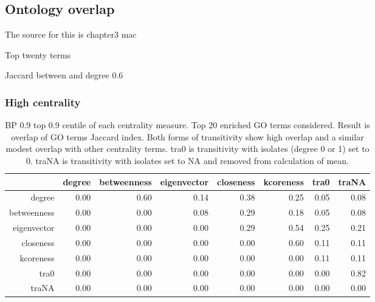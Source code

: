 \clearpage
\subsection{Ontology overlap}

The source for this is chapter3 mac

Top twenty terms

Jaccard between and degree 0.6

\subsubsection{High centrality}

\begin{table}[ht]
\centering
\begin{tabular}{rrrrrrrr}
  \hline
 & degree & betweenness & eigenvector & closeness & kcoreness & tra0 & traNA \\ 
  \hline
degree & 0.00 & 0.60 & 0.14 & 0.38 & 0.25 & 0.05 & 0.08 \\ 
  betweenness & 0.00 & 0.00 & 0.08 & 0.29 & 0.18 & 0.05 & 0.08 \\ 
  eigenvector & 0.00 & 0.00 & 0.00 & 0.29 & 0.54 & 0.25 & 0.21 \\ 
  closeness & 0.00 & 0.00 & 0.00 & 0.00 & 0.60 & 0.11 & 0.11 \\ 
  kcoreness & 0.00 & 0.00 & 0.00 & 0.00 & 0.00 & 0.11 & 0.11 \\ 
  tra0 & 0.00 & 0.00 & 0.00 & 0.00 & 0.00 & 0.00 & 0.82 \\ 
  traNA & 0.00 & 0.00 & 0.00 & 0.00 & 0.00 & 0.00 & 0.00 \\ 
   \hline
\end{tabular}
\caption{BP 0.9 top 0.9 centile of each centrality measure. Top 20 enriched GO terms considered. Result is overlap of GO terms Jaccard index. Both forms of transitivity show high overlap and a similar modest overlap with other centrality terms. tra0 is transitivity with isolates (degree 0 or 1) set to 0. traNA is transitivity with isolates set to NA and removed from calculation of mean.} 
\end{table}

